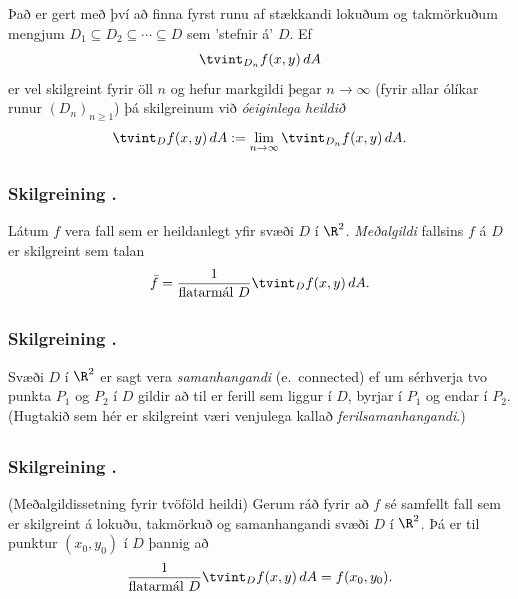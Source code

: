 \medskip
Það er gert með því að finna fyrst runu af stækkandi lokuðum og takmörkuðum mengjum $D_1 \subseteq D_2 \subseteq \cdots \subseteq D$ sem 'stefnir á' $D$. Ef
\begin {equation*}
\tvint_{D_n} f(x,y)\,dA
\end {equation*}
er vel skilgreint fyrir öll $n$ og hefur markgildi þegar $n\to \infty$ (fyrir allar ólíkar runur $(D_n)_{n\geq 1}$) þá 
skilgreinum við \emph{óeiginlega heildið}
\begin {equation*}
 \tvint_{D} f(x,y)\,dA := \lim_{n\to \infty} \tvint_{D_n} f(x,y)\,dA .
\end {equation*}








\subsection{} 

\subsubsection{Skilgreining \kaflanr.}
 Látum $f$ vera fall sem er heildanlegt yfir svæði $D$ í $\R^2$.  {\em Meðalgildi} fallsins $f$ á $D$ er skilgreint sem talan 
$$\bar{f}=\frac{1}{\mbox{flatarmál }D}\tvint_D f(x,y)\,dA.$$ 






\subsection{} 

\subsubsection{Skilgreining \kaflanr.}
Svæði $D$ í $\R^2$ er sagt vera {\em
  samanhangandi} (e.~connected) ef um sérhverja tvo punkta $P_1$ og $P_2$ í $D$
gildir að til er ferill sem liggur í $D$, byrjar í $P_1$ og endar í
$P_2$.  (Hugtakið sem hér er skilgreint væri venjulega kallað {\em
  ferilsamanhangandi}.) 






\subsection{} 

\subsubsection{Skilgreining \kaflanr.}
(Meðalgildissetning fyrir tvöföld heildi)
Gerum ráð fyrir að $f$ sé samfellt fall sem er skilgreint á lokuðu, takmörkuð og samanhangandi svæði $D$ í $\R^2$.   Þá er til punktur $(x_0,y_0)$ í $D$ þannig að 
$$\frac{1}{\mbox{flatarmál }D}\tvint_D f(x,y)\,dA=f(x_0,y_0).$$




